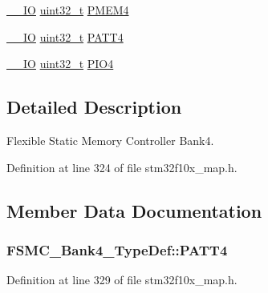 \begin{DoxyCompactItemize}
\item 
\hyperlink{group___c_m_s_i_s___c_m3__core__definitions_gaec43007d9998a0a0e01faede4133d6be}{\+\_\+\+\_\+\+IO} \hyperlink{_p_e___types_8h_a33594304e786b158f3fb30289278f5af}{uint32\+\_\+t} \hyperlink{struct_f_s_m_c___bank4___type_def_a4ed4ce751e7a8b3207bd20675b1d9085}{P\+M\+E\+M4}
\item 
\hyperlink{group___c_m_s_i_s___c_m3__core__definitions_gaec43007d9998a0a0e01faede4133d6be}{\+\_\+\+\_\+\+IO} \hyperlink{_p_e___types_8h_a33594304e786b158f3fb30289278f5af}{uint32\+\_\+t} \hyperlink{struct_f_s_m_c___bank4___type_def_a4cccc7802b573135311cc38e7f247ff5}{P\+A\+T\+T4}
\item 
\hyperlink{group___c_m_s_i_s___c_m3__core__definitions_gaec43007d9998a0a0e01faede4133d6be}{\+\_\+\+\_\+\+IO} \hyperlink{_p_e___types_8h_a33594304e786b158f3fb30289278f5af}{uint32\+\_\+t} \hyperlink{struct_f_s_m_c___bank4___type_def_a531ebc38c47bebfb198eafb4de24cb2a}{P\+I\+O4}
\end{DoxyCompactItemize}


\subsection{Detailed Description}
Flexible Static Memory Controller Bank4. 

Definition at line 324 of file stm32f10x\+\_\+map.\+h.



\subsection{Member Data Documentation}
\subsubsection[{\texorpdfstring{P\+A\+T\+T4}{PATT4}}]{ F\+S\+M\+C\+\_\+\+Bank4\+\_\+\+Type\+Def\+::\+P\+A\+T\+T4}\hypertarget{struct_f_s_m_c___bank4___type_def_ac6d400ebf96dbe451f01690a6987e89a}{}\label{struct_f_s_m_c___bank4___type_def_ac6d400ebf96dbe451f01690a6987e89a}


Definition at line 329 of file stm32f10x\+\_\+map.\+h.


